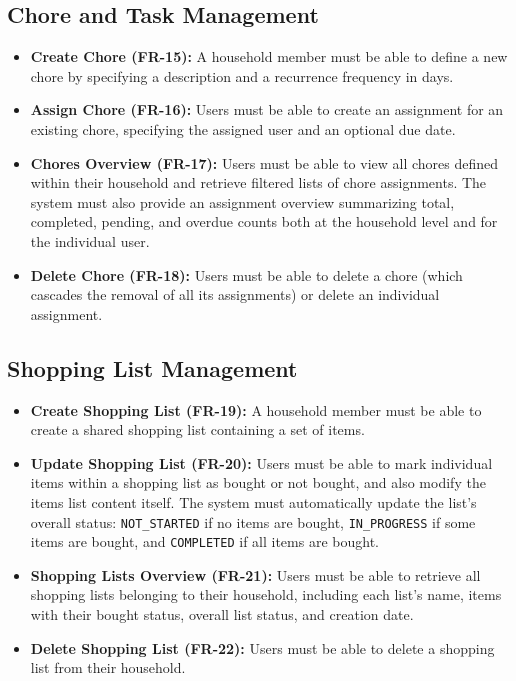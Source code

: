 \subsection{Chore and Task Management}
\begin{itemize}
    \item \textbf{Create Chore (FR-15):} A household member must be able to define a new chore by specifying a description and a recurrence frequency in days.
    \item \textbf{Assign Chore (FR-16):} Users must be able to create an assignment for an existing chore, specifying the assigned user and an optional due date.
    \item \textbf{Chores Overview (FR-17):} Users must be able to view all chores defined within their household and retrieve filtered lists of chore assignments. The system must also provide an assignment overview summarizing total, completed, pending, and overdue counts both at the household level and for the individual user.
    \item \textbf{Delete Chore (FR-18):} Users must be able to delete a chore (which cascades the removal of all its assignments) or delete an individual assignment.
\end{itemize}

\subsection{Shopping List Management}
\begin{itemize}
    \item \textbf{Create Shopping List (FR-19):} A household member must be able to create a shared shopping list containing a set of items.
    \item \textbf{Update Shopping List (FR-20):} Users must be able to mark individual items within a shopping list as bought or not bought, and also modify the items list content itself. The system must automatically update the list's overall status: \texttt{NOT\_STARTED} if no items are bought, \texttt{IN\_PROGRESS} if some items are bought, and \texttt{COMPLETED} if all items are bought.
    \item \textbf{Shopping Lists Overview (FR-21):} Users must be able to retrieve all shopping lists belonging to their household, including each list's name, items with their bought status, overall list status, and creation date.
    \item \textbf{Delete Shopping List (FR-22):} Users must be able to delete a shopping list from their household.
\end{itemize}

